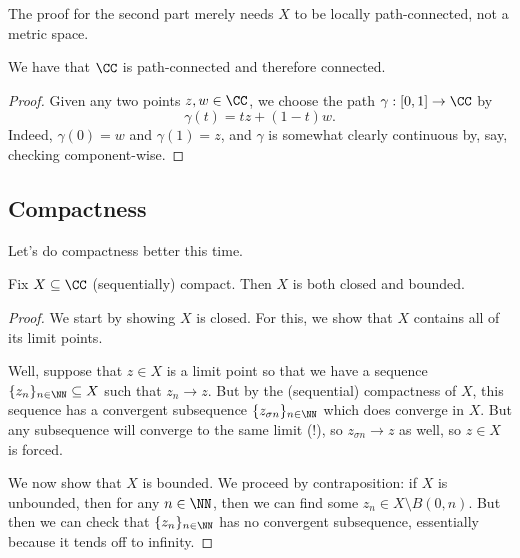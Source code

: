 \begin{remark}
	The proof for the second part merely needs $X$ to be locally path-connected, not a metric space.
\end{remark}
\begin{corollary}
	We have that $\CC$ is path-connected and therefore connected.
\end{corollary}
\begin{proof}
	Given any two points $z,w\in\CC$, we choose the path $\gamma:[0,1]\to\CC$ by
	\[\gamma(t)=tz+(1-t)w.\]
	Indeed, $\gamma(0)=w$ and $\gamma(1)=z$, and $\gamma$ is somewhat clearly continuous by, say, checking component-wise.
\end{proof}

\subsection{Compactness}
Let's do compactness better this time.
\begin{lemma}
	Fix $X\subseteq\CC$ (sequentially) compact. Then $X$ is both closed and bounded.
\end{lemma}
\begin{proof}
	We start by showing $X$ is closed. For this, we show that $X$ contains all of its limit points.
	
	Well, suppose that $z\in X$ is a limit point so that we have a sequence $\{z_n\}_{n\in\NN}\subseteq X$ such that $z_n\to z$. But by the (sequential) compactness of $X$, this sequence has a convergent subsequence $\{z_{\sigma n}\}_{n\in\NN}$ which does converge in $X$. But any subsequence will converge to the same limit (!), so $z_{\sigma n}\to z$ as well, so $z\in X$ is forced.

	We now show that $X$ is bounded. We proceed by contraposition: if $X$ is unbounded, then for any $n\in\NN$, then we can find some $z_n\in X\setminus B(0,n)$. But then we can check that $\{z_n\}_{n\in\NN}$ has no convergent subsequence, essentially because it tends off to infinity.
\end{proof}

